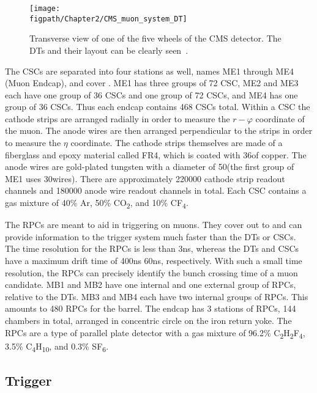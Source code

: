 \begin{figure}[!hbt]
	\centering
	\texttt{[image: \\figpath/Chapter2/CMS\_muon\_system\_DT]}
	\caption{Transverse view of one of the five wheels of the CMS detector. The DTs and their layout can be clearly seen~\cite{Chatrchyan:2008aa}.}
	\label{fig:CMS_muon_system_DT}
\end{figure}

The CSCs are separated into four stations as well, names ME1 through ME4 (Muon Endcap), and cover .
ME1 has three groups of 72 CSC, ME2 and ME3 each have one group of 36 CSCs and one group of 72 CSCs, and ME4 has one group of 36 CSCs.
Thus each endcap contains 468 CSCs total.
Within a CSC the cathode strips are arranged radially in order to measure the $r-\varphi$ coordinate of the muon.
The anode wires are then arranged perpendicular to the strips in order to measure the $\eta$ coordinate.
The cathode strips themselves are made of a fiberglass and epoxy material called FR4, which is coated with 36\mum of copper.
The anode wires are gold-plated tungsten with a diameter of 50\mum (the first group of ME1 uses 30\mum wires).
There are approximately 220000 cathode strip readout channels and 180000 anode wire readout channels in total.
Each CSC contains a gas mixture of 40\% Ar, 50\% CO\textsubscript{2}, and 10\% CF\textsubscript{4}.

The RPCs are meant to aid in triggering on muons.
They cover out to  and can provide information to the trigger system much faster than the DTs or CSCs.
The time resolution for the RPCs is less than 3\unit{ns}, whereas the DTs and CSCs have a maximum drift time of 400\unit{ns} 60\unit{ns}, respectively.
With such a small time resolution, the RPCs can precisely identify the bunch crossing time of a muon candidate.
MB1 and MB2 have one internal and one external group of RPCs, relative to the DTs.
MB3 and MB4 each have two internal groups of RPCs.
This amounts to 480 RPCs for the barrel.
The endcap has 3 stations of RPCs, 144 chambers in total, arranged in concentric circle on the iron return yoke.
The RPCs are a type of parallel plate detector with a gas mixture of 96.2\% C\textsubscript{2}H\textsubscript{2}F\textsubscript{4}, 3.5\% C\textsubscript{4}H\textsubscript{10}, and 0.3\% SF\textsubscript{6}.

\subsection{Trigger}

